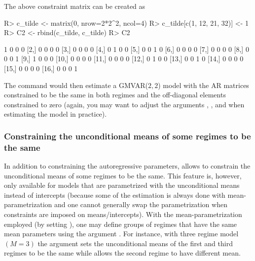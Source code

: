 \documentclass[nojss]{jss}
\begin{document}
The above constraint matrix can be created as
%
\begin{CodeChunk}
\begin{CodeInput}
R> c_tilde <- matrix(0, nrow=2*2^2, ncol=4)
R> c_tilde[c(1, 12, 21, 32)] <- 1
R> C2 <- rbind(c_tilde, c_tilde)
R> C2
\end{CodeInput}
\begin{CodeOutput}
      [,1] [,2] [,3] [,4]
 [1,]    1    0    0    0
 [2,]    0    0    0    0
 [3,]    0    0    0    0
 [4,]    0    1    0    0
 [5,]    0    0    1    0
 [6,]    0    0    0    0
 [7,]    0    0    0    0
 [8,]    0    0    0    1
 [9,]    1    0    0    0
[10,]    0    0    0    0
[11,]    0    0    0    0
[12,]    0    1    0    0
[13,]    0    0    1    0
[14,]    0    0    0    0
[15,]    0    0    0    0
[16,]    0    0    0    1
\end{CodeOutput}
\end{CodeChunk}
%
The command  would then estimate a GMVAR($2,2$) model with the AR matrices constrained to be the same in both regimes and the off-diagonal elements constrained to zero (again, you may want to adjust the arguments , , and  when estimating the model in practice).


\subsubsection{Constraining the unconditional means of some regimes to be the same}
In addition to constraining the autoregressive parameters,  allows to constrain the unconditional means of some regimes to be the same. This feature is, however, only available for models that are parametrized with the unconditional means instead of intercepts (because some of the estimation is always done with mean-parametrization and one cannot generally swap the parametrization when constraints are imposed on means/intercepts). With the mean-parametrization employed (by setting ), one may define groups of regimes that have the same mean parameters using the argument . For instance, with three regime model $(M=3)$ the argument  sets the unconditional means of the first and third regimes to be the same while allows the second regime to have different mean.
\end{document}
